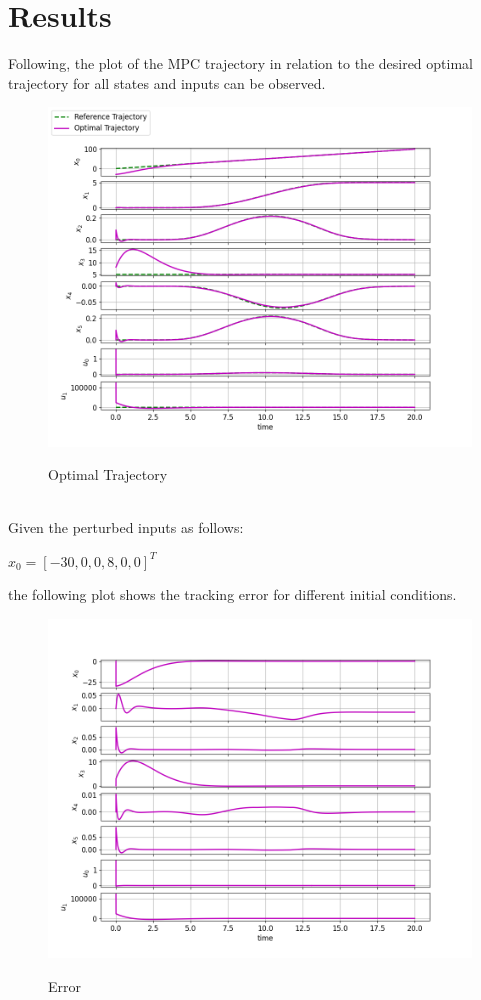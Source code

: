 \documentclass[a4paper,11pt,oneside]{book}
\begin{document}
\section{Results}
Following, the plot of the MPC trajectory in relation to the desired optimal trajectory for all states and inputs can be observed.
\begin{figure}[h]
    \centering
    \includegraphics[scale=.40]{figs/Task4/opt_trajectory} \\
    \caption{Optimal Trajectory}
    \label{fig:enter-label}
\end{figure}
\newpage
\\
Given the perturbed inputs as follows: 
\begin{center}
    $x_0=[-30, 0, 0, 8, 0, 0]^T$
\end{center}
the following plot shows the tracking error for different initial conditions.
\begin{figure}[h]
    \centering
    \includegraphics[scale=.40]{figs/Task4/error} \\
    \caption{Error}
    \label{fig:enter-label}
\end{figure}
\end{document}
